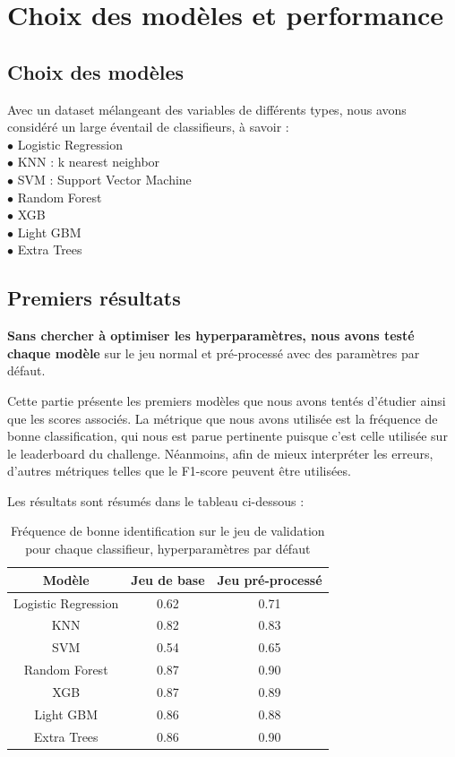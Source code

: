 \documentclass{article}
\begin{document}
\newpage

\section{Choix des modèles et performance}

\subsection{Choix des modèles}

Avec un dataset mélangeant des variables de différents types, nous avons considéré un large éventail de classifieurs, à savoir : 
\\
$\bullet$ Logistic Regression 
\\ $\bullet$ KNN : k nearest neighbor
\\ $\bullet$ SVM : Support Vector Machine 
\\ $\bullet$ Random Forest 
\\ $\bullet$ XGB 
\\ $\bullet$ Light GBM 
\\ $\bullet$ Extra Trees

\subsection{Premiers résultats}

\textbf{Sans chercher à optimiser les hyperparamètres, nous avons testé chaque modèle} sur le jeu normal et pré-processé avec des paramètres par défaut. 

Cette partie présente les premiers modèles que nous avons tentés d'étudier ainsi que les scores associés. La métrique que nous avons utilisée est la fréquence de bonne classification, qui nous est parue pertinente puisque c'est celle utilisée sur le leaderboard du challenge. Néanmoins, afin de mieux interpréter les erreurs, d'autres métriques telles que le F1-score peuvent être utilisées.

Les résultats sont résumés dans le tableau ci-dessous : 
\\

\begin{table}[h]
    \centering
    \begin{tabular}{|c|c|c|} \hline 
         Modèle&  Jeu de base& Jeu pré-processé\\ \hline 
         Logistic Regression&  0.62& 0.71\\ \hline 
         KNN&  0.82& 0.83\\ \hline 
         SVM&  0.54& 0.65\\ \hline 
         Random Forest&  0.87& 0.90\\ \hline 
         XGB&  0.87& 0.89\\ \hline 
         Light GBM&  0.86& 0.88\\ \hline 
         Extra Trees&  0.86& 0.90\\ \hline
    \end{tabular}
    \caption{Fréquence de bonne identification sur le jeu de validation pour chaque classifieur, hyperparamètres par défaut}
    \label{tab:my_label}
\end{table}
\end{document}
